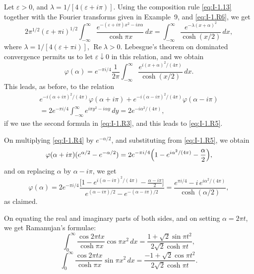 Let $\varepsilon>0$, and $\lambda=1/[4(\varepsilon+i\pi)]$. Using the composition rule \eqref{eq:I-1.13} together with the Fourier transforms given in Example~9, and \eqref{eq:I-1.R6}, we get
\begin{equation*}
2\pi^{1/2}(\varepsilon+\pi i)^{1/2}
\int_{-\infty}^{\infty}\frac{e^{-(\varepsilon+i\pi)x^2-ix\alpha}}{\cosh\pi x}\,dx
=\int_{-\infty}^{\infty}\frac{e^{-\lambda(x+\alpha)^2}}{\cosh(x/2)}\,dx,
\end{equation*}
where $\lambda=1/[4(\varepsilon+\pi i)]$, $\operatorname{Re}\lambda>0$. Lebesgue's theorem on dominated convergence permits us to let $\varepsilon\downarrow 0$ in this relation, and we obtain
\begin{equation*}
\varphi(\alpha)=e^{-\pi i/4}\frac{1}{2\pi}\int_{-\infty}^{\infty}\frac{e^{i(x+\alpha)^2/(4\pi)}}{\cosh(x/2)}\,dx.
\end{equation*}
This leads, as before, to the relation
\begin{multline*}
e^{-i(\alpha+i\pi)^2/(4\pi)}\varphi(\alpha+i\pi)
+e^{-i(\alpha-i\pi)^2/(4\pi)}\varphi(\alpha-i\pi)\\
=2e^{-\pi i/4}\int_{-\infty}^{\infty}e^{i\pi y^2-i\alpha y}\,dy
=2e^{-i\alpha^2/(4\pi)},
\end{multline*}
if we use the second formula in \eqref{eq:I-1.R3}, and this leads to \eqref{eq:I-1.R5}.

On multiplying \eqref{eq:I-1.R4} by $e^{-\alpha/2}$, and substituting from \eqref{eq:I-1.R5}, we obtain
\begin{equation*}
\varphi(\alpha+i\pi)(e^{\alpha/2}-e^{-\alpha/2})
=2e^{-\pi i/4}\Bigl(1-e^{i\alpha^2/(4\pi)}-\frac{\alpha}{2}\Bigr),
\end{equation*}
and on replacing $\alpha$ by $\alpha-i\pi$, we get
\begin{equation*}
\varphi(\alpha)=2e^{-\pi i/4}
\frac{\bigl[1-e^{i(\alpha-i\pi)^2/(4\pi)}-\frac{\alpha-i\pi}{2}\bigr]}
{e^{(\alpha-i\pi)/2}-e^{-(\alpha-i\pi)/2}}
=\frac{e^{\pi i/4}-i\,e^{i\alpha^2/(4\pi)}}{\cosh(\alpha/2)},
\end{equation*}
as claimed.

On equating the real and imaginary parts of both sides, and on setting $\alpha=2\pi t$, we get Ramanujan's formulae:
\begin{equation*}
\int_0^\infty\frac{\cos 2\pi t x}{\cosh\pi x}\cos\pi x^2\,dx
=\frac{1+\sqrt2\sin\pi t^2}{2\sqrt2\cosh\pi t},
\end{equation*}
\begin{equation*}
\int_0^\infty\frac{\cos 2\pi t x}{\cosh\pi x}\sin\pi x^2\,dx
=\frac{-1+\sqrt2\cos\pi t^2}{2\sqrt2\cosh\pi t}.
\end{equation*}

